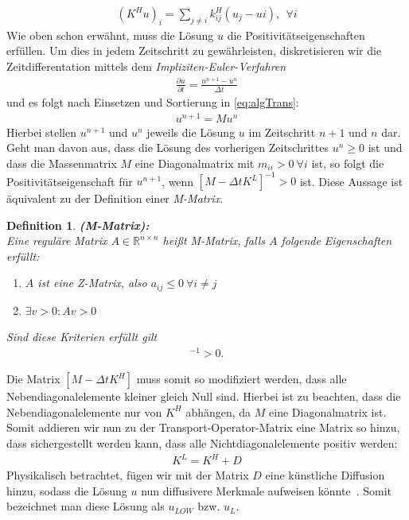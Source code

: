 \documentclass[a4paper,11pt]{article}
\newtheorem{defi}{Definition}[section]
\begin{document}
\begin{align}
 (K^Hu)_i=\sum_{j\neq i}k_{ij}^H(u_j-ui),~~\forall i
\end{align}
  Wie oben schon erwähnt, muss die Lösung $u$ die Positivitätseigenschaften erfüllen. Um dies in jedem Zeitschritt zu gewährleisten, diskretisieren wir die Zeitdifferentation mittels dem \textit{Impliziten-Euler-Verfahren}
\begin{align}
 \frac{\partial u}{\partial t}=\frac{u^{n+1}-u^{n}}{\Delta t}
\end{align}
und es folgt nach Einsetzen und Sortierung in \eqref{eq:algTrans}:
\begin{align}
 [M-\Delta tK^H]u^{n+1}=Mu^n\label{eq:zeitschritt}
\end{align}
Hierbei stellen $u^{n+1}$ und $u^n$ jeweils die Lösung $u$ im Zeitschritt $n+1$  und $n$ dar.
Geht man davon aus, dass die Lösung des vorherigen Zeitschrittes $u^n\ge0$ ist und dass die Massenmatrix $M$ eine Diagonalmatrix mit $m_{ii}>0~\forall i$ ist, so folgt die Positivitätseigenschaft für $u^{n+1}$, wenn $[M-\Delta tK^L]^{-1}>0$ ist. Diese Aussage ist äquivalent zu der Definition einer \textit{M-Matrix}.
\begin{defi}\label{def:MMatrix}
 \textbf{(M-Matrix):}\\
Eine reguläre Matrix $A\in \mathbb{R}^{n\times n}$ heißt M-Matrix, falls $A$ folgende Eigenschaften erfüllt:
\begin{enumerate}
 \item $A$ ist eine Z-Matrix, also $a_{ij}\le0~\forall i\neq j$
 \item $\exists v>0:Av>0$~\cite{fiedler2008special}
\end{enumerate}
Sind diese Kriterien erfüllt gilt
\begin{align*}
 [M-\Delta tK^L]^{-1}>0.
\end{align*}
\end{defi}
 Die Matrix $[M-\Delta tK^H]$ muss somit so modifiziert werden, dass alle Nebendiagonalelemente kleiner gleich Null sind. Hierbei ist zu beachten, dass die Nebendiagonalelemente nur von $K^H$ abhängen, da $M$ eine Diagonalmatrix ist. Somit addieren wir nun zu der Transport-Operator-Matrix eine Matrix so hinzu, dass sichergestellt werden kann, dass alle Nichtdiagonalelemente positiv werden:
\begin{align}
 K^L=K^H+D\label{eq:AddDif}
\end{align}
Physikalisch betrachtet, fügen wir mit der Matrix $D$ eine künstliche Diffusion hinzu, sodass die Lösung $u$ nun diffusivere Merkmale aufweisen könnte~\cite{kuzmin2002flux}. Somit bezeichnet man diese Lösung als $u_{LOW}$ bzw. $u_L$.\\
\end{document}

